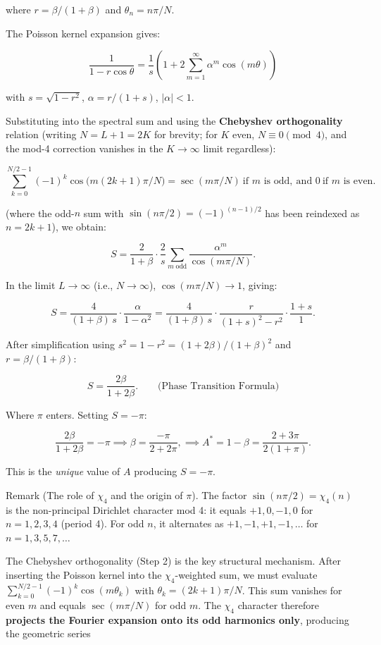 \documentclass[
  11pt,
]{article}
\begin{document}
where \(r = \beta/(1+\beta)\) and \(\theta_n = n\pi/N\).

The Poisson kernel expansion gives:

\[\frac{1}{1 - r\cos\theta} = \frac{1}{s}\left(1 + 2\sum_{m=1}^{\infty} \alpha^m \cos(m\theta)\right)\]

with \(s = \sqrt{1 - r^2}\), \(\alpha = r/(1 + s)\), \(|\alpha| < 1\).

Substituting into the spectral sum and using the \textbf{Chebyshev
orthogonality} relation (writing \(N = L+1 = 2K\) for brevity; for \(K\) even,
\(N \equiv 0 \pmod{4}\), and the mod-4 correction vanishes in the
\(K \to \infty\) limit regardless):

\[\sum_{k=0}^{N/2 - 1} (-1)^k \cos\!\bigl(m(2k+1)\pi/N\bigr)
= \sec(m\pi/N)\ \text{if } m \text{ is odd},\ \text{and } 0\ \text{if } m \text{ is even}.\]

(where the odd-\(n\) sum with \(\sin(n\pi/2) = (-1)^{(n-1)/2}\) has been
reindexed as \(n = 2k+1\)), we obtain:

\[S = \frac{2}{1+\beta} \cdot \frac{2}{s} \sum_{m\;\mathrm{odd}} \frac{\alpha^m}{\cos(m\pi/N)}.\]

In the limit \(L \to \infty\) (i.e., \(N \to \infty\)), \(\cos(m\pi/N) \to 1\),
giving:

\[S = \frac{4}{(1+\beta)\,s} \cdot \frac{\alpha}{1 - \alpha^2} = \frac{4}{(1+\beta)\,s} \cdot \frac{r}{(1+s)^2 - r^2} \cdot \frac{1+s}{1}.\]

After simplification using \(s^2 = 1 - r^2 = (1 + 2\beta)/(1+\beta)^2\) and
\(r = \beta/(1+\beta)\):

\[S = \frac{2\beta}{1 + 2\beta}. \qquad \text{(Phase Transition Formula)}\]

Where \(\pi\) enters. Setting \(S = -\pi\):

\[\frac{2\beta}{1 + 2\beta} = -\pi \implies \beta = \frac{-\pi}{2 + 2\pi}, \implies A^{\ast} = 1 - \beta = \frac{2 + 3\pi}{2(1+\pi)}.\]

This is the \emph{unique} value of \(A\) producing \(S = -\pi\).

Remark (The role of \(\chi_4\) and the origin of \(\pi\)). The factor
\(\sin(n\pi/2) = \chi_4(n)\) is the non-principal Dirichlet character mod 4: it
equals \(+1, 0, -1, 0\) for \(n = 1, 2, 3, 4\) (period 4). For odd \(n\), it
alternates as \(+1, -1, +1, -1, \ldots\) for \(n = 1, 3, 5, 7, \ldots\)

The Chebyshev orthogonality (Step 2) is the key structural mechanism. After
inserting the Poisson kernel into the \(\chi_4\)-weighted sum, we must evaluate
\(\sum_{k=0}^{N/2-1} (-1)^k \cos(m\theta_k)\) with \(\theta_k = (2k+1)\pi/N\).
This sum vanishes for even \(m\) and equals \(\sec(m\pi/N)\) for odd \(m\). The
\(\chi_4\) character therefore \textbf{projects the Fourier expansion onto its
odd harmonics only}, producing the geometric series
\end{document}

